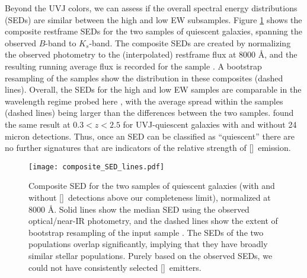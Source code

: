 \documentclass[twocolumn,natbib,iop,hyperref]{aastex62}
\newcommand{\oii}{[\ion{O}{2}]}
\begin{document}
Beyond the UVJ colors, we can assess if the overall spectral energy distributions (SEDs) are similar between the high and low EW subsamples.  Figure \ref{fig:sed} shows the composite restframe SEDs for the two samples of quiescent galaxies, spanning the observed $B$-band to $K_s$-band.  The composite SEDs are created by normalizing the observed photometry to the (interpolated) restframe flux at 8000 \AA, and the resulting running average flux is recorded for the sample \cite[see][]{2010ApJ...722L..64K}.  A bootstrap resampling of the samples show the distribution in these composites (dashed lines).  Overall, the SEDs for the high and low EW samples are comparable in the wavelength regime probed here \cite[cf. GALEX/near-UV detections in some quiescent galaxies from][]{2007ApJS..173..512S}, with the average spread within the samples (dashed lines) being larger than the differences between the two samples.  \citet{2014ApJ...796...35F} found the same result at $0.3 < z < 2.5$  for UVJ-quiescent galaxies with and without 24 micron detections.  Thus, once an SED can be classified as ``quiescent'' there are no further signatures that are indicators of the relative strength of \oii\ emission.


\begin{figure}
\begin{center}
\texttt{[image: composite\_SED\_lines.pdf]} %
\caption{Composite SED for the two samples of quiescent galaxies (with and without \oii\ detections above our completeness limit), normalized at 8000 \AA.  Solid lines show the median SED using the observed optical/near-IR photometry, and the dashed lines show the extent of bootstrap resampling of the input sample \cite[see][]{2010ApJ...722L..64K}.  The SEDs of the two populations overlap significantly, implying that they have broadly similar stellar populations.  Purely based on the observed SEDs, we could not have consistently selected \oii\ emitters.}
\label{fig:sed}
\end{center}
\end{figure}
\end{document}
